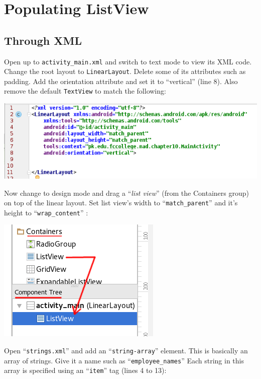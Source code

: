 \section{Populating ListView}
\subsection{Through XML}
Open up to \texttt{activity\_main.xml} and switch to text mode to view its XML code. Change the root layout to \texttt{LinearLayout}. Delete some of its attributes such as padding. Add the orientation attribute and set it to ``vertical'' (line 8). Also remove the default \texttt{TextView} to match the following:

\begin{center}
	\includegraphics[scale=0.4]{chapters/ch10/images/2}
\end{center}

Now change to design mode and drag a ``\textit{list view}'' (from the Containers group) on top of the linear layout. Set list view's width to ``\texttt{match\_parent}'' and it's height to ``\texttt{wrap\_content}'' :

\begin{center}
	\includegraphics[scale=0.4]{chapters/ch10/images/3}
\end{center}

Open ``\texttt{strings.xml}'' and add an ``\texttt{string-array}'' element. This is basically an array of strings. Give it a name such as ``\texttt{employee\_names}'' Each string in this array is specified using an ``\texttt{item}'' tag (lines 4 to 13):

